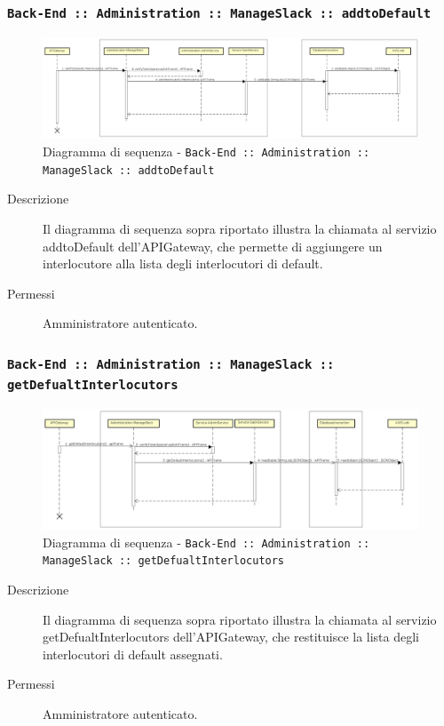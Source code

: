 \documentclass[../DefinizioneDiProdotto.tex]{subfiles}
\begin{document}
		\newpage
		\subsubsection{\texttt{Back-End :: Administration :: ManageSlack :: addtoDefault}}
		\begin{figure}[!h]
			\centering
			\includegraphics[width=\textwidth]{DiagrammiSequenza/Back-End/manageSlack/addtoDefault.png}
			\caption{Diagramma di sequenza - \texttt{Back-End :: Administration :: ManageSlack :: addtoDefault }}
		\end{figure}
		\begin{description}
			\item [Descrizione] Il diagramma di sequenza sopra riportato illustra la chiamata al servizio addtoDefault dell'APIGateway, che permette di aggiungere un interlocutore alla lista degli interlocutori di default.
			\item [Permessi] Amministratore autenticato.
		\end{description}

		\subsubsection{\texttt{Back-End :: Administration :: ManageSlack :: getDefualtInterlocutors}}
		\begin{figure}[!h]
			\centering
			\includegraphics[width=\textwidth]{DiagrammiSequenza/Back-End/manageSlack/getDefualtInterlocutors.png}
			\caption{Diagramma di sequenza - \texttt{Back-End :: Administration :: ManageSlack :: getDefualtInterlocutors}}
		\end{figure}
		\begin{description}
			\item [Descrizione] Il diagramma di sequenza sopra riportato illustra la chiamata al servizio getDefualtInterlocutors dell'APIGateway, che restituisce la lista degli interlocutori di default assegnati.
			\item [Permessi] Amministratore autenticato.
		\end{description}
\end{document}
